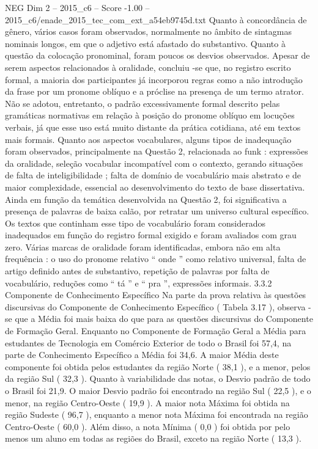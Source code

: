\begin{textsample}{NEG Dim 2 – 2015\_c6 – Score -1.00 – 2015\_c6/enade\_2015\_tec\_com\_ext\_a54eb9745d.txt}
Quanto à concordância de gênero, vários casos foram observados, normalmente no âmbito de sintagmas nominais longos, em que o adjetivo está afastado do substantivo.
Quanto à questão da colocação pronominal, foram poucos os desvios observados.
Apesar de serem aspectos relacionados à oralidade, concluiu -se que, no registro escrito formal, a maioria dos participantes já incorporou regras como a não introdução da frase por um pronome oblíquo e a próclise na presença de um termo atrator.
Não se adotou, entretanto, o padrão excessivamente formal descrito pelas gramáticas normativas em relação à posição do pronome oblíquo em locuções verbais, já que esse uso está muito distante da prática cotidiana, até em textos mais formais.
Quanto aos aspectos vocabulares, alguns tipos de inadequação foram observados, principalmente na Questão 2, relacionada ao funk : expressões da oralidade, seleção vocabular incompatível com o contexto, gerando situações de falta de inteligibilidade ; falta de domínio de vocabulário mais abstrato e de maior complexidade, essencial ao desenvolvimento do texto de base dissertativa.
Ainda em função da temática desenvolvida na Questão 2, foi significativa a presença de palavras de baixa calão, por retratar um universo cultural específico.
Os textos que continham esse tipo de vocabulário foram considerados inadequados em função do registro formal exigido e foram avaliados com grau zero.
Várias marcas de oralidade foram identificadas, embora não em alta frequência : o uso do pronome relativo “ onde ” como relativo universal, falta de artigo definido antes de substantivo, repetição de palavras por falta de vocabulário, reduções como “ tá ” e “ pra ”, expressões informais. 3.3.2 Componente de Conhecimento Específico Na parte da prova relativa às questões discursivas do Componente de Conhecimento Específico ( Tabela 3.17 ), observa -se que a Média foi mais baixa do que para as questões discursivas do Componente de Formação Geral.
Enquanto no Componente de Formação Geral a Média para estudantes de Tecnologia em Comércio Exterior de todo o Brasil foi 57,4, na parte de Conhecimento Específico a Média foi 34,6.
A maior Média deste componente foi obtida pelos estudantes da região Norte ( 38,1 ), e a menor, pelos da região Sul ( 32,3 ).
Quanto à variabilidade das notas, o Desvio padrão de todo o Brasil foi 21,9.
O maior Desvio padrão foi encontrado na região Sul ( 22,5 ), e o menor, na região Centro-Oeste ( 19,9 ).
A maior nota Máxima foi obtida na região Sudeste ( 96,7 ), enquanto a menor nota Máxima foi encontrada na região Centro-Oeste ( 60,0 ).
Além disso, a nota Mínima ( 0,0 ) foi obtida por pelo menos um aluno em todas as regiões do Brasil, exceto na região Norte ( 13,3 ).

\end{textsample}

